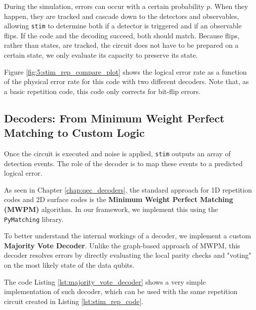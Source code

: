 During the simulation, errors can occur with a certain probability $p$. When they happen, they are tracked and cascade down to the detectors and observables, allowing \texttt{stim} to determine both if a detector is triggered and if an observable flips. If the code and the decoding succeed, both should match. Because flips, rather than states, are tracked, the circuit does not have to be prepared on a certain state, we only evaluate its capacity to preserve its state.

Figure \ref{fig:5:stim_rep_compare_plot} shows the logical error rate as a function of the physical error rate for this code with two different decoders. Note that, as a basic repetition code, this code only corrects for bit-flip errors.




\subsection{Decoders: From Minimum Weight Perfect Matching to Custom Logic}
\label{subsec:decoders_intro}

Once the circuit is executed and noise is applied, \texttt{stim} outputs an array of detection events. The role of the decoder is to map these events to a predicted logical error. 

As seen in Chapter \ref{chap:qec_decoders}, the standard approach for 1D repetition codes and 2D surface codes is the \textbf{Minimum Weight Perfect Matching (MWPM)} algorithm. In our framework, we implement this using the \texttt{PyMatching} library.

To better understand the internal workings of a decoder, we implement a custom \textbf{Majority Vote Decoder}. Unlike the graph-based approach of MWPM, this decoder resolves errors by directly evaluating the local parity checks and "voting" on the most likely state of the data qubits. 

The code Listing \ref{lst:majority_vote_decoder} shows a very simple implementation of such decoder, which can be used with the same repetition circuit created in Listing \ref{lst:stim_rep_code}. 

